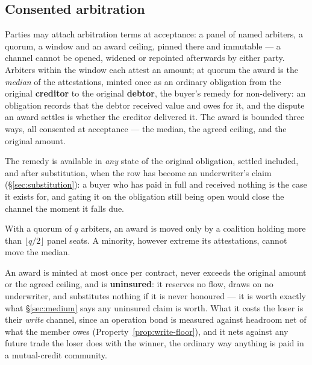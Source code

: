 \subsection{Consented arbitration}

Parties may attach arbitration terms at acceptance: a panel of named arbiters, a quorum,
a window and an award ceiling, pinned there and immutable --- a channel cannot be opened,
widened or repointed afterwards by either party. Arbiters within the window each attest an
amount; at quorum the award is the \emph{median} of the attestations, minted once as an
ordinary obligation from the original \textbf{creditor} to the original \textbf{debtor},
the buyer's remedy for non-delivery: an obligation records that the debtor received value
and owes for it, and the dispute an award settles is whether the creditor delivered it.
The award is bounded three ways, all consented at acceptance --- the median, the agreed
ceiling, and the original amount.

The remedy is available in \emph{any} state of the original obligation, settled included,
and after substitution, when the row has become an underwriter's claim
(\S\ref{sec:substitution}): a buyer who has paid in full and received nothing is the case
it exists for, and gating it on the obligation still being open would close the channel
the moment it falls due.

\begin{property}
\label{prop:median}
With a quorum of $q$ arbiters, an award is moved only by a coalition holding more than
$\lfloor q/2 \rfloor$ panel seats. A minority, however extreme its attestations, cannot
move the median.
\end{property}

\begin{property}
\label{prop:additive}
An award is minted at most once per contract, never exceeds the original amount or the
agreed ceiling, and is \textbf{uninsured}: it reserves no flow, draws on no underwriter,
and substitutes nothing if it is never honoured --- it is worth exactly what
\S\ref{sec:medium} says any uninsured claim is worth. What it costs the loser is their
\emph{write} channel, since an operation bond is measured against headroom net of what the
member owes (Property~\ref{prop:write-floor}), and it nets against any future trade the
loser does with the winner, the ordinary way anything is paid in a mutual-credit
community.
\end{property}

